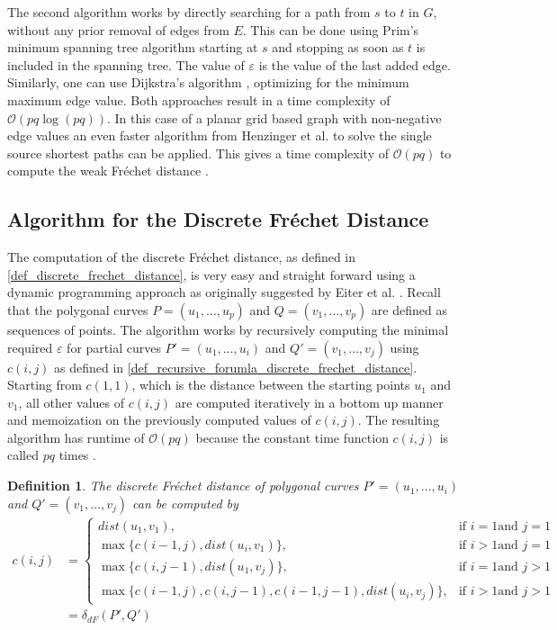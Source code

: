 \documentclass[
oneside,
fontsize=11pt
]{scrartcl}
\newtheorem{mydef}{Definition}
\begin{document}
The second algorithm works by directly searching for a path from $s$ to $t$ in $G$,
without any prior removal of edges from $E$.
This can be done using Prim's minimum spanning tree algorithm \cite{prim_shortest_1957} starting at $s$ 
and stopping as soon as $t$ is included in the spanning tree. 
The value of $\varepsilon$ is the value of the last added edge.
Similarly, one can use Dijkstra's algorithm \cite{dijkstra_note_1959}, 
optimizing for the minimum maximum edge value.
Both approaches result in a time complexity of $\mathcal{O}(pq \log (pq))$. \cite{alt_computing_1995}
In this case of a planar grid based graph with non-negative edge values 
an even faster algorithm from Henzinger et al. \cite{henzinger_faster_1997} to solve the single source shortest paths 
can be applied. This gives a time complexity of $\mathcal{O}(pq)$ to compute the weak Fréchet distance \cite{van_leusden_novel_2013}.


\subsection{Algorithm for the Discrete Fréchet Distance}
\label{sec_discrete_algorithm}
The computation of the discrete Fréchet distance, as defined in \autoref{def_discrete_frechet_distance}, is very easy and straight forward 
using a dynamic programming approach as originally suggested by Eiter et al. \cite{eiter_computing_1994}.
Recall that the polygonal curves $P = (u_1, \dots, u_p)$ and $Q = (v_1, \dots, v_p)$ are defined as sequences of points.
The algorithm works by recursively computing the minimal required $\varepsilon$ for partial curves 
$P' = (u_1, \dots, u_i)$ and $Q' = (v_1, \dots, v_j)$
using $c(i,j)$ as defined in \autoref{def_recursive_forumla_discrete_frechet_distance}.
Starting from $c(1,1)$, which is the distance between the starting points $u_1$ and $v_1$,
all other values of $c(i,j)$ are computed iteratively in a bottom up manner 
and memoization on the previously computed values of $c(i,j)$.
The resulting algorithm has runtime of $\mathcal{O}(pq)$
because the constant time function $c(i,j)$ is called $pq$ times \cite{eiter_computing_1994}.

\begin{mydef}
  \label{def_recursive_forumla_discrete_frechet_distance}
  The discrete Fréchet distance of polygonal curves $P' = (u_1, \dots, u_i)$ and $Q' = (v_1, \dots, v_j)$
  can be computed by
  \begin{align*}
    c(i,j) &= \begin{cases}
      dist(u_1, v_1), &\text{if } i=1 \text{and } j=1 \\
      \max \{c(i-1,j), dist(u_i, v_1)\}, &\text{if } i>1 \text{and } j=1 \\
      \max \{c(i,j-1), dist(u_1, v_j)\}, &\text{if } i=1 \text{and } j>1 \\
      \max \{c(i-1,j), c(i,j-1), c(i-1,j-1), dist(u_i, v_j)\}, &\text{if } i>1 \text{and } j>1
    \end{cases} \\
    &= \delta_{dF}(P',Q')
  \end{align*}
\end{mydef}
\end{document}

